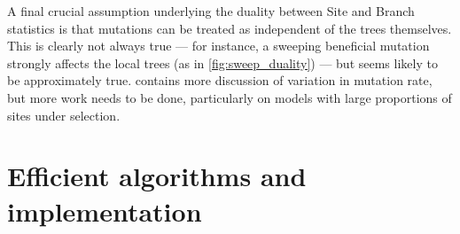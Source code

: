 \documentclass{article}
\begin{document}

A final crucial assumption underlying the duality between Site and Branch
statistics is that mutations can be treated as independent of the trees themselves.
This is clearly not always true --- for instance,
a sweeping beneficial mutation strongly affects the local trees (as in \autoref{fig:sweep_duality}) ---
but seems likely to be approximately true.
\citet{ralph2019empirical} contains more discussion of variation in mutation rate,
but more work needs to be done, particularly on models with large proportions of sites under selection.


\section*{Efficient algorithms and implementation}

\end{document}

